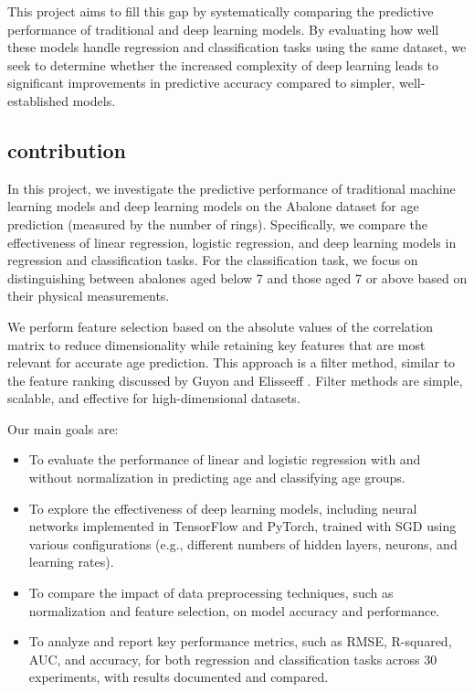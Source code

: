 \documentclass[conference]{IEEEtran}
\begin{document}
This project aims to fill this gap by systematically comparing the predictive performance of traditional and deep learning models. By evaluating how well these models handle regression and classification tasks using the same dataset, we seek to determine whether the increased complexity of deep learning leads to significant improvements in predictive accuracy compared to simpler, well-established models.

\subsection{contribution}

In this project, we investigate the predictive performance of traditional machine learning models and deep learning models on the Abalone dataset for age prediction (measured by the number of rings). Specifically, we compare the effectiveness of linear regression, logistic regression, and deep learning models in regression and classification tasks. For the classification task, we focus on distinguishing between abalones aged below 7 and those aged 7 or above based on their physical measurements.

We perform feature selection based on the absolute values of the correlation matrix to reduce dimensionality while retaining key features that are most relevant for accurate age prediction. This approach is a filter method, similar to the feature ranking discussed by Guyon and Elisseeff \cite{guyon2003introduction}. Filter methods are simple, scalable, and effective for high-dimensional datasets.

Our main goals are:
\begin{itemize}
\item To evaluate the performance of linear and logistic regression with and without normalization in predicting age and classifying age groups.
\item To explore the effectiveness of deep learning models, including neural networks implemented in TensorFlow and PyTorch, trained with SGD using various configurations (e.g., different numbers of hidden layers, neurons, and learning rates).
\item To compare the impact of data preprocessing techniques, such as normalization and feature selection, on model accuracy and performance.
\item To analyze and report key performance metrics, such as RMSE, R-squared, AUC, and accuracy, for both regression and classification tasks across 30 experiments, with results documented and compared.
\end{itemize}
\end{document}
